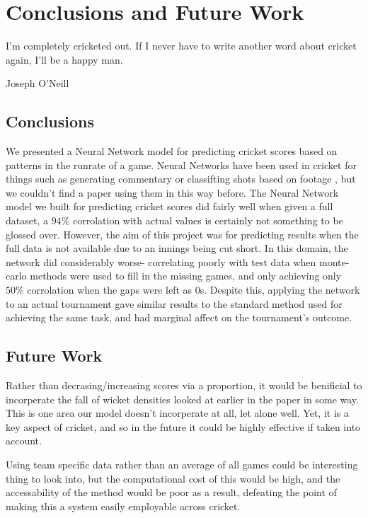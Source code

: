 \chapter{Conclusions and Future Work}

\epigraph{I'm completely cricketed out. If I never have to write another word about cricket again, I'll be a happy man.}{Joseph O'Neill}

\section{Conclusions}
We presented a Neural Network model for predicting cricket scores based on patterns in the runrate of a game. Neural Networks have been used in cricket for things such as 
generating commentary \cite{kumar2} or classifting shots based on footage \cite{foysal}, but we couldn't find a paper using them in this way before. 
The Neural Network model we built for predicting cricket scores did fairly well when given a full dataset, a $94\%$ corrolation with actual values is certainly not 
something to be glossed over. However, the aim of this project was for predicting results when the full data is not available due to an innings being cut short. 
In this domain, the network did considerably worse- correlating poorly with test data when monte-carlo methods were used to fill in the missing games, and only achieving only $50\%$ 
corrolation when the gaps were left as 0s. Despite this, applying the network to an actual tournament gave similar results to the standard method used for achieving the same task, and had 
marginal affect on the tournament's outcome. 


\section{Future Work}
Rather than decrasing/increasing scores via a proportion, it would be benificial to incorperate the fall of wicket densities looked at earlier in the paper in some way. This is one 
area our model doesn't incorperate at all, let alone well. Yet, it is a key aspect of cricket, and so in the future it could be highly effective if taken into account. 

Using team specific data rather than an average of all games could be interesting thing to look into, but the computational cost of this would be high, and the accessability of the 
method would be poor as a result, defeating the point of making this a system easily employable across cricket. 
